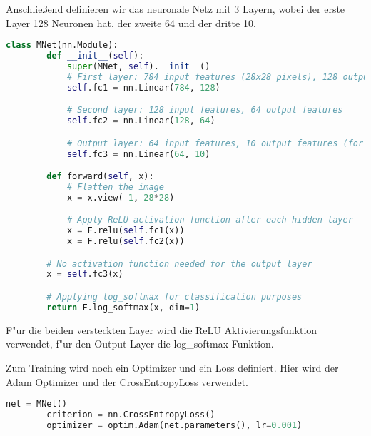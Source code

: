 \documentclass[a4paper,11pt,titlepage]{article}
\begin{document}
    Anschließend definieren wir das neuronale Netz mit 3 Layern, wobei der erste Layer 128 Neuronen hat, der zweite 64 und der dritte 10.
    \begin{lstlisting}[language=Python]
    class MNet(nn.Module):
        def __init__(self):
            super(MNet, self).__init__()
            # First layer: 784 input features (28x28 pixels), 128 output features
            self.fc1 = nn.Linear(784, 128)

            # Second layer: 128 input features, 64 output features
            self.fc2 = nn.Linear(128, 64)

            # Output layer: 64 input features, 10 output features (for 10 classes)
            self.fc3 = nn.Linear(64, 10)

        def forward(self, x):
            # Flatten the image
            x = x.view(-1, 28*28)

            # Apply ReLU activation function after each hidden layer
            x = F.relu(self.fc1(x))
            x = F.relu(self.fc2(x))

        # No activation function needed for the output layer
        x = self.fc3(x)

        # Applying log_softmax for classification purposes
        return F.log_softmax(x, dim=1)
    \end{lstlisting}
    F"ur die beiden versteckten Layer wird die ReLU Aktivierungsfunktion verwendet, f"ur den Output Layer die log\_softmax Funktion.

    Zum Training wird noch ein Optimizer und ein Loss definiert. Hier wird der Adam Optimizer und der CrossEntropyLoss verwendet.
    \begin{lstlisting}[language=Python]
        net = MNet()
        criterion = nn.CrossEntropyLoss()
        optimizer = optim.Adam(net.parameters(), lr=0.001)
    \end{lstlisting}
\end{document}
